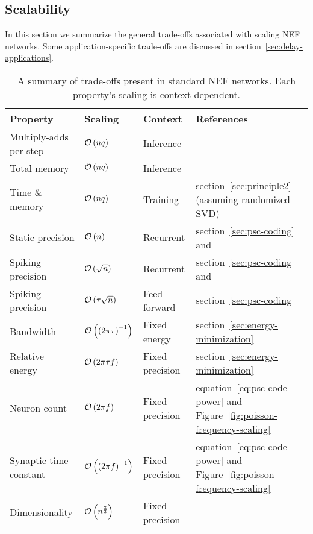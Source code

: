 \subsection{Scalability}
\label{sec:scalability}

In this section we summarize the general trade-offs associated with scaling NEF networks.
Some application-specific trade-offs are discussed in section~\ref{sec:delay-applications}.

\begin{sidewaystable}
\centering
  \begin{tabular}{@{}llll@{}} \toprule
    Property & Scaling & Context & References \\
    \midrule
    Multiply-adds per step & $\mathcal{O}\left({nq}\right)$ & Inference & \citet{voelker2018} \\
    Total memory & $\mathcal{O}\left({nq}\right)$ & Inference & \citet{mundy2015, voelker2018} \\
    Time \& memory & $\mathcal{O}\left({nq}\right)$ & Training & section~\ref{sec:principle2} (assuming randomized SVD) \\
    Static precision & $\mathcal{O}\left({n}\right)$ & Recurrent & section~\ref{sec:psc-coding} and \citet[][p.~47]{eliasmith2003a} \\
    Spiking precision & $\mathcal{O}\left({\sqrt{n}}\right)$ & Recurrent & section~\ref{sec:psc-coding} and \citet[][p.~47]{eliasmith2003a} \\
    Spiking precision & $\mathcal{O}\left({\tau \sqrt{n}}\right)$ & Feed-forward & section~\ref{sec:psc-coding} \\
    Bandwidth & $\mathcal{O}\left({\left(2\pi \tau \right)^{-1}}\right)$ & Fixed energy & section~\ref{sec:energy-minimization} \\
    Relative energy & $\mathcal{O}\left({2\pi \tau f }\right)$ & Fixed precision & section~\ref{sec:energy-minimization} \\
    Neuron count & $\mathcal{O}\left({2 \pi f}\right)$ & Fixed precision & equation~\ref{eq:psc-code-power} and Figure~\ref{fig:poisson-frequency-scaling} \\
    Synaptic time-constant & $\mathcal{O}\left({\left(2 \pi f\right)^{-1}}\right)$ & Fixed precision & equation~\ref{eq:psc-code-power} and Figure~\ref{fig:poisson-frequency-scaling} \\
    Dimensionality & $\mathcal{O}\left({ n^{\frac{2}{3}} }\right)$ & Fixed precision & \citet[][p.~60]{gosmann2018} \\ %
    \bottomrule
  \end{tabular}
  \caption{ \label{tab:scalability}
    A summary of trade-offs present in standard NEF networks.
    Each property's scaling is context-dependent.
  }
\end{sidewaystable}

